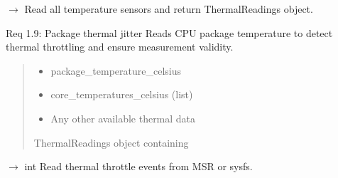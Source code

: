 \documentclass[letterpaper,10pt,english]{sphinxmanual}
\begin{document}
\begin{fulllineitems}

\begin{fulllineitems}
\label{\detokenize{core.readers.sensor_reader:core.readers.sensor_reader.SensorReader.read_temperatures}}
\pysigstartsignatures
\pysiglinewithargsret
{}
{}
{{ $\rightarrow$ {\hyperref[\detokenize{core.models.energy_measurement:core.models.energy_measurement.ThermalReadings}]{}}}}
\pysigstopsignatures
\sphinxAtStartPar
Read all temperature sensors and return ThermalReadings object.

\sphinxAtStartPar
Req 1.9: Package thermal jitter \sphinxhyphen{} Reads CPU package temperature
to detect thermal throttling and ensure measurement validity.
\begin{quote}\begin{description}
\sphinxAtStartPar
\begin{itemize}
\item {} 
\sphinxAtStartPar
package\_temperature\_celsius

\item {} 
\sphinxAtStartPar
core\_temperatures\_celsius (list)

\item {} 
\sphinxAtStartPar
Any other available thermal data

\end{itemize}


\sphinxAtStartPar
ThermalReadings object containing

\end{description}\end{quote}

\end{fulllineitems}


\begin{fulllineitems}
\label{\detokenize{core.readers.sensor_reader:core.readers.sensor_reader.SensorReader.read_throttle_events}}
\pysigstartsignatures
\pysiglinewithargsret
{}
{}
{{ $\rightarrow$ int}}
\pysigstopsignatures
\sphinxAtStartPar
Read thermal throttle events from MSR or sysfs.


\end{fulllineitems}
\end{fulllineitems}
\end{document}
